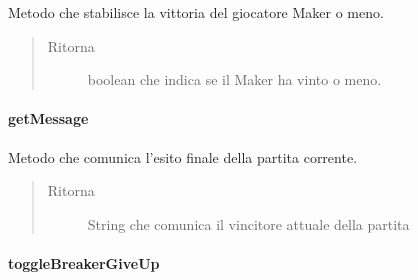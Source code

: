 \documentclass[letterpaper,10pt,italian,openany,oneside]{sphinxmanual}
\begin{document}
\begin{fulllineitems}
\label{\detokenize{source/it/unicam/cs/pa/mastermind/gamecore/MatchState:it.unicam.cs.pa.mastermind.gamecore.MatchState.getHasMakerWon()}}
Metodo che stabilisce la vittoria del giocatore Maker o meno.
\begin{quote}\begin{description}
\item[{Ritorna}] \leavevmode
boolean che indica se il Maker ha vinto o meno.

\end{description}\end{quote}

\end{fulllineitems}



\paragraph{getMessage}
\label{\detokenize{source/it/unicam/cs/pa/mastermind/gamecore/MatchState:getmessage}}

\begin{fulllineitems}
\label{\detokenize{source/it/unicam/cs/pa/mastermind/gamecore/MatchState:it.unicam.cs.pa.mastermind.gamecore.MatchState.getMessage()}}
Metodo che comunica l’esito finale della partita corrente.
\begin{quote}\begin{description}
\item[{Ritorna}] \leavevmode
String che comunica il vincitore attuale della partita

\end{description}\end{quote}

\end{fulllineitems}



\paragraph{toggleBreakerGiveUp}
\label{\detokenize{source/it/unicam/cs/pa/mastermind/gamecore/MatchState:togglebreakergiveup}}
\end{document}
